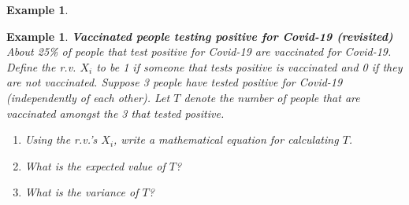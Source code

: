 \documentclass[12pt]{amsart}
\newtheorem{example}[theorem]{Example}
\begin{document}
{\begin{example}

\end{example} 





 \newpage

\begin{example}\label{VaccBinom}  \textbf{Vaccinated people testing positive for Covid-19 (revisited)} \newline
About 25\% of people that test positive for Covid-19 are vaccinated for Covid-19.\newline
Define the r.v. $X_i$ to be 1 if someone that tests positive is vaccinated and 0 if they are not vaccinated. \newline
Suppose 3 people have tested positive for Covid-19 (independently of each other). \newline
Let $T$ denote the number of people that are vaccinated amongst the 3 that tested positive.


\begin{enumerate}
\item Using the r.v.'s $X_i$, write a mathematical equation for calculating $T$.

\vspace{2cm}

\item What is the expected value of $T$?

\vspace{3.5cm}

\item What is the variance of $T$?

\vspace{4cm}
%



\end{enumerate}
\end{example}}
\end{document}
